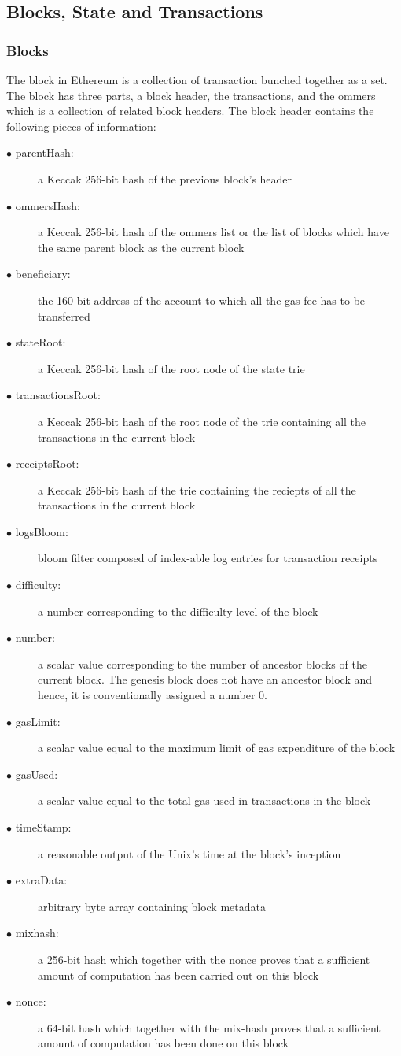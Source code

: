 \documentclass[a4paper,twoside,phd]{BYUPhys}
\begin{document}
\subsection{Blocks, State and Transactions}
\subsubsection{Blocks}
The block in Ethereum is a collection of transaction bunched together as a set. The block has three parts, a block header, the transactions, and the ommers which is a collection of related block headers. The block header contains the following pieces of information:
\begin{description}
\item[$\bullet$ parentHash:] a Keccak 256-bit hash of the previous block's header
\item[$\bullet$ ommersHash:] a Keccak 256-bit hash of the ommers list or the list of blocks which have the same parent block as the current block
\item[$\bullet$ beneficiary:] the 160-bit address of the account to which all the gas fee has to be transferred
\item[$\bullet$ stateRoot:] a Keccak 256-bit hash of the root node of the state trie
\item[$\bullet$ transactionsRoot:] a Keccak 256-bit hash of the root node of the trie containing all the transactions in the current block
\item[$\bullet$ receiptsRoot:] a Keccak 256-bit hash of the trie containing the reciepts of all the transactions in the current block
\item[$\bullet$ logsBloom:] bloom filter composed of index-able log entries for transaction receipts
\item[$\bullet$ difficulty:] a number corresponding to the difficulty level of the block
\item[$\bullet$ number:] a scalar value corresponding to the number of ancestor blocks of the current block. The genesis block does not have an ancestor block and hence, it is conventionally assigned a number 0.
\item[$\bullet$ gasLimit:] a scalar value equal to the maximum limit of gas expenditure of the block
\item[$\bullet$ gasUsed:] a scalar value equal to the total gas used in transactions in the block
\item[$\bullet$ timeStamp:] a reasonable output of the Unix's time at the block's inception
\item[$\bullet$ extraData:] arbitrary byte array containing block metadata
\item[$\bullet$ mixhash:] a 256-bit hash which together with the nonce proves that a sufficient amount of computation has been carried out on this block
\item[$\bullet$ nonce:] a 64-bit hash which together with the mix-hash proves that a sufficient amount of computation has been done on this block
\end{description}
\end{document}
